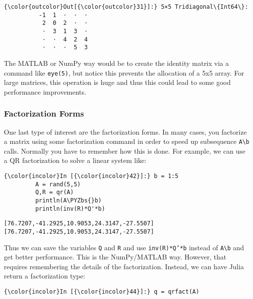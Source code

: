\documentclass[11pt]{article}
\def\PYZbs{\char`\\}
\begin{document}
            \begin{Verbatim}[commandchars=\\\{\}]
{\color{outcolor}Out[{\color{outcolor}31}]:} 5×5 Tridiagonal\{Int64\}:
          -1  1  ⋅  ⋅  ⋅
           2  0  2  ⋅  ⋅
           ⋅  3  1  3  ⋅
           ⋅  ⋅  4  2  4
           ⋅  ⋅  ⋅  5  3
\end{Verbatim}
        
    The MATLAB or NumPy way would be to create the identity matrix via a
command like \texttt{eye(5)}, but notice this prevents the allocation of
a 5x5 array. For large matrices, this operation is huge and thus this
could lead to some good performance improvements.

    \subsubsection{Factorization Forms}\label{factorization-forms}

One last type of interest are the factorization forms. In many cases,
you factorize a matrix using some factorization command in order to
speed up subsequence \texttt{A\textbackslash{}b} calls. Normally you
have to remember how this is done. For example, we can use a QR
factorization to solve a linear system like:

    \begin{Verbatim}[commandchars=\\\{\}]
{\color{incolor}In [{\color{incolor}42}]:} b = 1:5
         A = rand(5,5)
         Q,R = qr(A)
         println(A\PYZbs{}b)
         println(inv(R)*Q'*b)
\end{Verbatim}

    \begin{Verbatim}[commandchars=\\\{\}]
[76.7207,-41.2925,10.9053,24.3147,-27.5507]
[76.7207,-41.2925,10.9053,24.3147,-27.5507]

    \end{Verbatim}

    Thus we can save the variables \texttt{Q} and \texttt{R} and use
\texttt{inv(R)*Q'*b} instead of \texttt{A\textbackslash{}b} and get
better performance. This is the NumPy/MATLAB way. However, that requires
remembering the details of the factorization. Instead, we can have Julia
return a factorization type:

    \begin{Verbatim}[commandchars=\\\{\}]
{\color{incolor}In [{\color{incolor}44}]:} q = qrfact(A)
\end{Verbatim}
\end{document}
